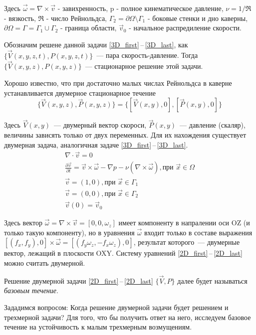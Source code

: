 Здесь $ \vec \omega = \nabla \times \vec v $ - завихренность, p - полное кинематическое давление,
$ \nu = 1 / \Re $ - вязкость, $ \Re $ - число Рейнольдса, $ \Gamma_2 = \partial \Omega \setminus \Gamma_1 $ - боковые стенки и дно каверны, $ \partial \Omega = \Gamma = \Gamma_1 \cup \Gamma_2 $ - 
граница области, $\vec v _0$ - начальное распредиление скорости. 

Обозначим решене данной задачи \ref{3D_first}\,--\,\ref{3D_last}, как $ \{ \vec V(x,y,z,t), P(x,y,z,t) \} $~--- пара скорость-давление. Тогда $ \{ \vec V(x,y,z), P(x,y,z) \} $~--- стационарное решение этой задачи. 

Хорошо известно, что при достаточно малых числах Рейнольдса в каверне устанавливается двумерное стационарное течение $$ 
  \{\vec V(x,y,z), \vec P(x,y,z) \} = \{[\vec V(x,y), 0], [\vec P(x,y), 0]\}
$$

Здесь $\vec V(x,y)$~--- двумерный вектор скороси, $ \vec P(x,y) $~--- давление (скаляр), величины зависять только от двух переменных. Для их нахождения существует двумерная задача, аналогичная задаче \ref{3D_first}\,--\,\ref{3D_last}.
\begin{gather}
  \label{2D_first}
  \nabla \cdot \vec v = 0 \\
  \frac{\partial \vec v}{\partial t} = \vec v \times \vec \omega - \nabla p - 
  \nu ( \nabla \times \vec \omega ), \text{при } \vec x \in \Omega\\
  \vec v = (1,0), \text{при } \vec x \in \Gamma_1\\
  \vec v = (0,0), \text{при } \vec x \in \Gamma_2\\
  \vec v (0) = \vec v _0
  \label{2D_last}
\end{gather}

Здесь вектор $ \vec \omega = \nabla \times \vec v = [0,0,\omega_z]$ имеет компоненту в напралении оси OZ (и только такую компоненту), но в уравнения $ \vec \omega $ входит только в составе выражения $ [(f_x,f_y),0] \times \vec \omega = [(f_y \omega_z, -f_x \omega_z), 0]$, результат которого~--- двумерные вектор, лежащий в плоскости OXY. Систему уравнений \ref{2D_first}\,--\,\ref{2D_last} можно считать двумерной. 

Решение двумерной задачи \ref{2D_first}\,--\,\ref{2D_last} $\{ \vec V, P \}$ далее будет называться \textit{базовым течение}.

Зададимся вопросом: Когда решение двумерной задачи будет решением и трехмерной задачи? Для того, что бы получить ответ на него, исследуем базовое течение на устойчивость к малым трехмерным возмущениям. 

